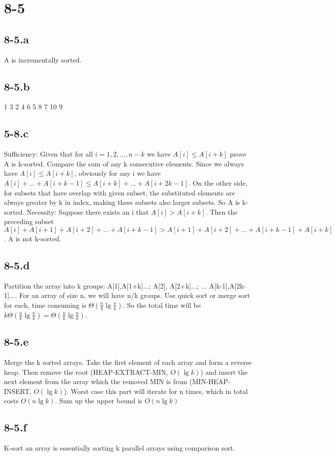 \documentclass{article}
\begin{document}
	 \section*{8-5}
	 \subsection*{8-5.a}
	 A is incrementally sorted.
	 \subsection*{8-5.b}
	 1 3 2 4 6 5 8 7 10 9
	 \subsection*{5-8.c}
	 Sufficiency:
	 Given that for all $i = 1,2,...,n-k$ we have $A[i] \leq A[i+k]$ prove A is k-sorted.
	 Compare the sum of any k consecutive elements. Since we always have $A[i] \leq A[i+k]$, obviously for any i we have $A[i]+...+A[i+k-1] \leq A[i+k]+...+A[i+2k-1]$. On the other side, for subsets that have overlap with given subset, the substituted elements are always greater by k in index, making these subsets also larger subsets. So A is k-sorted.
	 Necessity:
	 Suppose there exists an i that $A[i] > A[i+k]$. Then the preceding subset $A[i]+A[i+1]+A[i+2]+...+A[i+k-1] > A[i+1]+A[i+2]+...+A[i+k-1]+A[i+k]$. A is not k-sorted.
	 \subsection*{8-5.d}
	 Partition the array into k groups: A[1],A[1+k]...; A[2], A[2+k]...; ... A[k-1],A[2k-1].... For an array of size n, we will have n/k groups. Use quick sort or merge sort for each, time consuming is $\Theta(\frac{n}{k}\lg\frac{n}{k}).$ So the total time will be $k\Theta(\frac{n}{k}\lg\frac{n}{k}) = \Theta
	 (\frac{n}{k}\lg\frac{n}{k})$.
	 \subsection*{8-5.e}
	 Merge the k sorted arrays. Take the first element of each array and form a reverse heap. Then remove the root (HEAP-EXTRACT-MIN, $O(\lg k)$) and insert the next element from the array which the removed MIN is from (MIN-HEAP-INSERT, $O(\lg k)$). Worst case this part will iterate for n times, which in total costs $O(n\lg k)$. Sum up the upper bound is $O(n\lg k)$
	 \subsection*{8-5.f}
	 K-sort an array is essentially sorting k parallel arrays using comparison sort.
\end{document}
